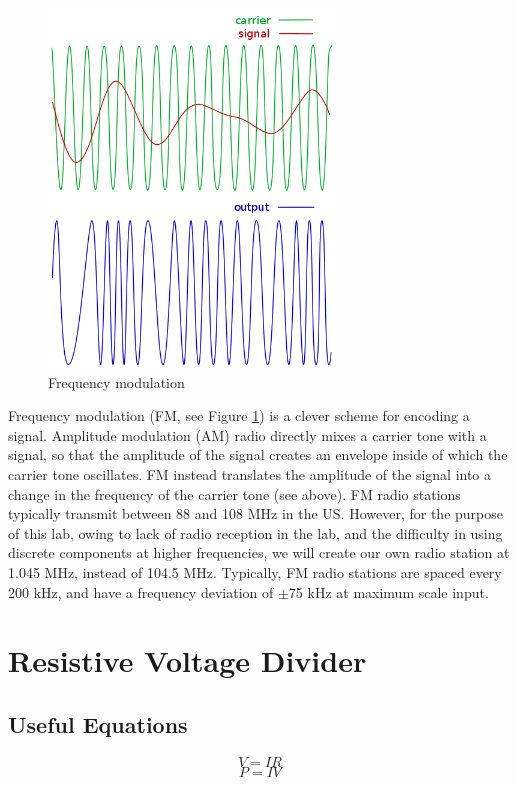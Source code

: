 \documentclass[11pt]{article}
\begin{document}
\begin{figure}[h]
\centering
\includegraphics[width=3in]{analog_lab_1_plots/frequency_modulation.png}
\caption{Frequency modulation}\label{fig:frequency_modulation}
\end{figure}

Frequency modulation (FM, see Figure \ref{fig:frequency_modulation}) is a clever scheme for 
encoding a signal.  Amplitude modulation (AM) radio
directly mixes a carrier tone with a signal, so that the amplitude of the signal creates an envelope inside
of which the carrier tone oscillates.  FM instead translates the amplitude of the signal into a change
in the frequency of the carrier tone (see above).  FM radio stations typically transmit between 88 and 108 MHz
in the US.  However, for the purpose of this lab, owing to lack of radio reception in the lab, and the
difficulty in using discrete components at higher frequencies, we will create our own radio station at
1.045 MHz, instead of 104.5 MHz.  Typically, FM radio stations are spaced every 200 kHz, and have a frequency
deviation of $\pm$75 kHz at maximum scale input.

\section{Resistive Voltage Divider}

\subsection{Useful Equations}
\begin{equation}
V=IR
\end{equation}
\begin{equation}
P=IV
\end{equation}
\end{document}
